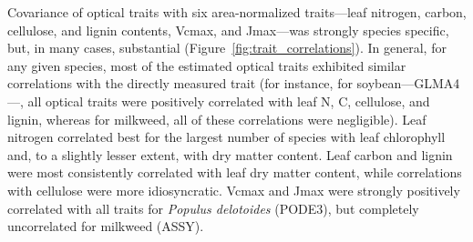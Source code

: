 Covariance of optical traits with six area-normalized traits---leaf nitrogen, carbon, cellulose, and lignin contents, Vcmax, and Jmax---was strongly species specific, but, in many cases, substantial (Figure~\ref{fig:trait_correlations}).
% 
% 
% 
In general, for any given species, most of the estimated optical traits exhibited similar correlations with the directly measured trait (for instance, for soybean---GLMA4---, all optical traits were positively correlated with leaf N, C, cellulose, and lignin, whereas for milkweed, all of these correlations were negligible).
% 
% 
Leaf nitrogen correlated best for the largest number of species with leaf chlorophyll and, to a slightly lesser extent, with dry matter content.
Leaf carbon and lignin were most consistently correlated with leaf dry matter content, while correlations with cellulose were more idiosyncratic.
Vcmax and Jmax were strongly positively correlated with all traits for \textit{Populus delotoides} (PODE3), but completely uncorrelated for milkweed (ASSY).


